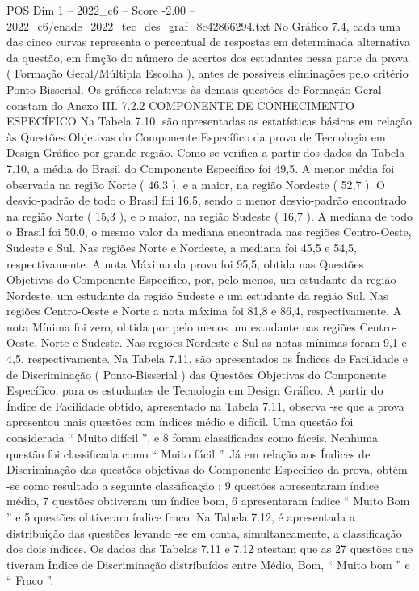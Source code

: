\begin{textsample}{POS Dim 1 – 2022\_c6 – Score -2.00 – 2022\_c6/enade\_2022\_tec\_des\_graf\_8c42866294.txt}
No Gráfico 7.4, cada uma das cinco curvas representa o percentual de respostas em determinada alternativa da questão, em função do número de acertos dos estudantes nessa parte da prova ( Formação Geral/Múltipla Escolha ), antes de possíveis eliminações pelo critério Ponto-Bisserial.
Os gráficos relativos às demais questões de Formação Geral constam do Anexo III. 7.2.2 COMPONENTE DE CONHECIMENTO ESPECÍFICO Na Tabela 7.10, são apresentadas as estatísticas básicas em relação às Questões Objetivas do Componente Específico da prova de Tecnologia em Design Gráfico por grande região.
Como se verifica a partir dos dados da Tabela 7.10, a média do Brasil do Componente Específico foi 49,5.
A menor média foi observada na região Norte ( 46,3 ), e a maior, na região Nordeste ( 52,7 ).
O desvio-padrão de todo o Brasil foi 16,5, sendo o menor desvio-padrão encontrado na região Norte ( 15,3 ), e o maior, na região Sudeste ( 16,7 ).
A mediana de todo o Brasil foi 50,0, o mesmo valor da mediana encontrada nas regiões Centro-Oeste, Sudeste e Sul.
Nas regiões Norte e Nordeste, a mediana foi 45,5 e 54,5, respectivamente.
A nota Máxima da prova foi 95,5, obtida nas Questões Objetivas do Componente Específico, por, pelo menos, um estudante da região Nordeste, um estudante da região Sudeste e um estudante da região Sul.
Nas regiões Centro-Oeste e Norte a nota máxima foi 81,8 e 86,4, respectivamente.
A nota Mínima foi zero, obtida por pelo menos um estudante nas regiões Centro-Oeste, Norte e Sudeste.
Nas regiões Nordeste e Sul as notas mínimas foram 9,1 e 4,5, respectivamente.
Na Tabela 7.11, são apresentados os Índices de Facilidade e de Discriminação ( Ponto-Bisserial ) das Questões Objetivas do Componente Específico, para os estudantes de Tecnologia em Design Gráfico.
A partir do Índice de Facilidade obtido, apresentado na Tabela 7.11, observa -se que a prova apresentou mais questões com índices médio e difícil.
Uma questão foi considerada “ Muito difícil ”, e 8 foram classificadas como fáceis.
Nenhuma questão foi classificada como “ Muito fácil ”.
Já em relação aos Índices de Discriminação das questões objetivas do Componente Específico da prova, obtém -se como resultado a seguinte classificação : 9 questões apresentaram índice médio, 7 questões obtiveram um índice bom, 6 apresentaram índice “ Muito Bom ” e 5 questões obtiveram índice fraco.
Na Tabela 7.12, é apresentada a distribuição das questões levando -se em conta, simultaneamente, a classificação dos dois índices.
Os dados das Tabelas 7.11 e 7.12 atestam que as 27 questões que tiveram Índice de Discriminação distribuídos entre Médio, Bom, “ Muito bom ” e “ Fraco ”.

\end{textsample}
